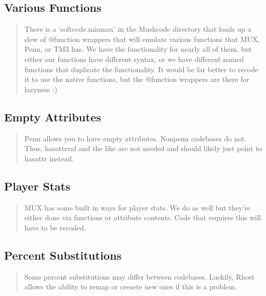 \documentclass[letterpaper,10pt,english]{sphinxmanual}
\begin{document}
\subsection{Various Functions}
\label{\detokenize{differences:various-functions}}\begin{quote}

\sphinxAtStartPar
There is a ‘softcode.minmax’ in the Mushcode directory that loads up a slew
of @function wrappers that will emulate various functions that MUX, Penn, or
TM3 has.  We have the functionality for nearly all of them, but either our
functions have different syntax, or we have different named functions that
duplicate the functionality.  It would be far better to recode it to use
the native functions, but the @function wrappers are there for lazyness :)
\end{quote}


\subsection{Empty Attributes}
\label{\detokenize{differences:empty-attributes}}\begin{quote}

\sphinxAtStartPar
Penn allows you to have empty attributes.  Non\sphinxhyphen{}penn codebases do not.
Thus, hasattrval and the like are not needed and should likely just point
to hasattr instead.
\end{quote}


\subsection{Player Stats}
\label{\detokenize{differences:player-stats}}\begin{quote}

\sphinxAtStartPar
MUX has some built in ways for player stats.  We do as well but they’re
either done via functions or attribute contents.  Code that requires this
will have to be recoded.
\end{quote}


\subsection{Percent Substitutions}
\label{\detokenize{differences:percent-substitutions}}\begin{quote}

\sphinxAtStartPar
Some percent substitutions may differ between codebases.  Luckily, Rhost
allows the ability to remap or creaete new ones if this is a problem.
\end{quote}
\end{document}
